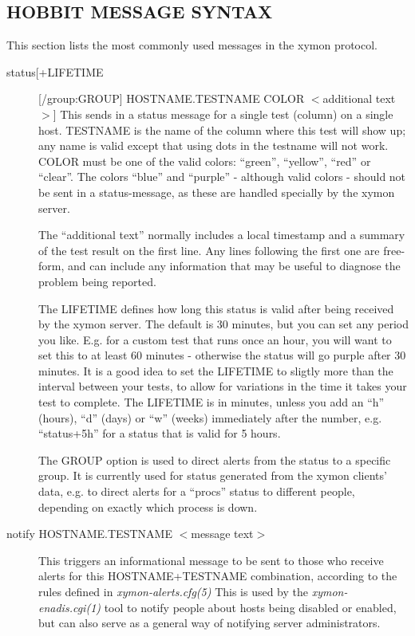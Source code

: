 \subsection{HOBBIT MESSAGE SYNTAX}


This section lists the most commonly used messages in the xymon protocol. 


\begin{description}

\item[status[+LIFETIME][/group:GROUP] HOSTNAME.TESTNAME COLOR
  $<$additional text$>$] This sends in a status message for a single
  test (column) on a single host. TESTNAME is the name of the column
  where this test will show up; any name is valid except that using
  dots in the testname will not work. COLOR must be one of the valid
  colors: ``green'', ``yellow'', ``red'' or ``clear''. The colors
  ``blue'' and ``purple'' - although valid colors - should not be sent
  in a status-message, as these are handled specially by the xymon
  server.  

The ``additional text'' normally includes a local timestamp and a
summary of the test result on the first line. Any lines following the
first one are free-form, and can include any information that may be
useful to diagnose the problem being reported.  

The LIFETIME defines how long this status is valid after being
received by the xymon server. The default is 30 minutes, but you can
set any period you like. E.g. for a custom test that runs once an
hour, you will want to set this to at least 60 minutes - otherwise the
status will go purple after 30 minutes. It is a good idea to set the
LIFETIME to sligtly more than the interval between your tests, to
allow for variations in the time it takes your test to complete. The
LIFETIME is in minutes, unless you add an ``h'' (hours), ``d'' (days)
or ``w'' (weeks) immediately after the number, e.g. ``status+5h'' for
a status that is valid for 5 hours.  


The GROUP option is used to direct alerts from the status to a
specific group. It is currently used for status generated from the
xymon clients' data, e.g. to direct alerts for a ``procs'' status to
different people, depending on exactly which process is down. 


 

\item[notify HOSTNAME.TESTNAME $<$message text$>$] This triggers an
 informational message to be sent to those who receive alerts for this
 HOSTNAME+TESTNAME combination, according to the rules defined in
 \emph{xymon-alerts.cfg(5)}  This is used by the
 \emph{xymon-enadis.cgi(1)} tool to notify people about hosts being
 disabled or enabled, but can also serve as a general way of notifying
 server administrators. 



\end{description}
